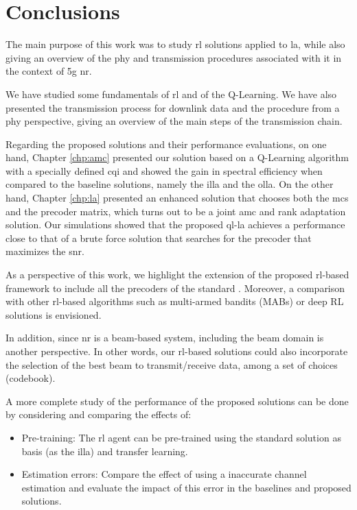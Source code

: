 \glsresetall
%

\chapter{Conclusions}%
\label{chp:conclusion}

The main purpose of this work was to study \gls{rl} solutions applied to \gls{la}, while also giving an overview of the \gls{phy} and transmission procedures associated with it in the context of \gls{5g} \gls{nr}.

We have studied some fundamentals of \gls{rl} and of the Q-Learning.
%
We have also presented the transmission process for downlink data and the procedure from a \gls{phy} perspective, giving an overview of the main steps of the transmission chain.

Regarding the proposed solutions and their performance evaluations, on one hand, Chapter \ref{chp:amc} presented our solution based on a Q-Learning algorithm with a specially defined \gls{cqi} and showed the gain in spectral efficiency when compared to the baseline solutions, namely the \gls{illa} and the \gls{olla}.
%
On the other hand, Chapter \ref{chp:la} presented an enhanced solution that chooses both the \gls{mcs} and the precoder matrix, which turns out to be a joint \gls{amc} and rank adaptation solution.
%
Our simulations showed that the proposed \gls{ql-la} achieves a performance close to that of a brute force solution that searches for the precoder that maximizes the \gls{snr}.

As a perspective of this work, we highlight the extension of the proposed \gls{rl}-based framework to include all the precoders of the standard \cite{3gpp.38.214}.
%
Moreover, a comparison with other \gls{rl}-based algorithms such as multi-armed bandits (MABs) \cite{zhou2015survey} or deep RL solutions \cite{DeepRLSurvey} is envisioned.

In addition, since \gls{nr} is a beam-based system, including the beam domain is another perspective.
%
In other words, our \gls{rl}-based solutions could also incorporate the selection of the best beam to transmit/receive data, among a set of choices (codebook).

A more complete study of the performance of the proposed solutions can be done by considering and comparing the effects of:
\begin{itemize}
    \item Pre-training: The \gls{rl} agent can be pre-trained using the standard solution as basis (as the \gls{illa}) and transfer learning.
    \item Estimation errors: Compare the effect of using a inaccurate channel estimation and evaluate the impact of this error in the baselines and proposed solutions.
\end{itemize}

